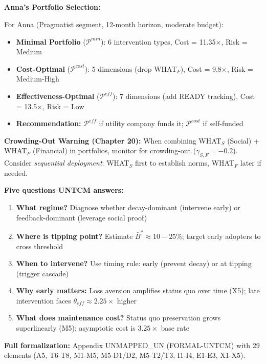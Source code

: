 \textbf{Anna's Portfolio Selection:}

For Anna (Pragmatist segment, 12-month horizon, moderate budget):
\begin{itemize}[nosep]
\item \textbf{Minimal Portfolio} ($\mathcal{P}^{min}$): 6 intervention types, Cost = 11.35$\times$, Risk = Medium
\item \textbf{Cost-Optimal} ($\mathcal{P}^{cost}$): 5 dimensions (drop WHAT$_F$), Cost = 9.8$\times$, Risk = Medium-High
\item \textbf{Effectiveness-Optimal} ($\mathcal{P}^{eff}$): 7 dimensions (add READY tracking), Cost = 13.5$\times$, Risk = Low
\item \textbf{Recommendation:} $\mathcal{P}^{eff}$ if utility company funds it; $\mathcal{P}^{cost}$ if self-funded
\end{itemize}

\textbf{Crowding-Out Warning (Chapter 20):} When combining WHAT$_S$ (Social) + WHAT$_F$ (Financial) in portfolios, monitor for crowding-out ($\gamma_{S,F} = -0.2$). Consider \textit{sequential deployment}: WHAT$_S$ first to establish norms, WHAT$_F$ later if needed.

\begin{tcolorbox}[colback=blue!5!white, colframe=blue!75!black, title=UNTCM Summary for Practitioners]
\textbf{Five questions UNTCM answers:}
\begin{enumerate}[nosep]
\item \textbf{What regime?} Diagnose whether decay-dominant (intervene early) or feedback-dominant (leverage social proof)
\item \textbf{Where is tipping point?} Estimate $\bar{B}^* \approx 10-25\%$; target early adopters to cross threshold
\item \textbf{When to intervene?} Use timing rule: early (prevent decay) or at tipping (trigger cascade)
\item \textbf{Why early matters:} Loss aversion amplifies status quo over time (X5); late intervention faces $\theta_{eff} \approx 2.25\times$ higher
\item \textbf{What does maintenance cost?} Status quo preservation grows superlinearly (M5); asymptotic cost is $3.25\times$ base rate
\end{enumerate}
\textbf{Full formalization:} Appendix UNMAPPED_UN (FORMAL-UNTCM) with 29 elements (A5, T6-T8, M1-M5, M5-D1/D2, M5-T2/T3, I1-I4, E1-E3, X1-X5).
\end{tcolorbox}

